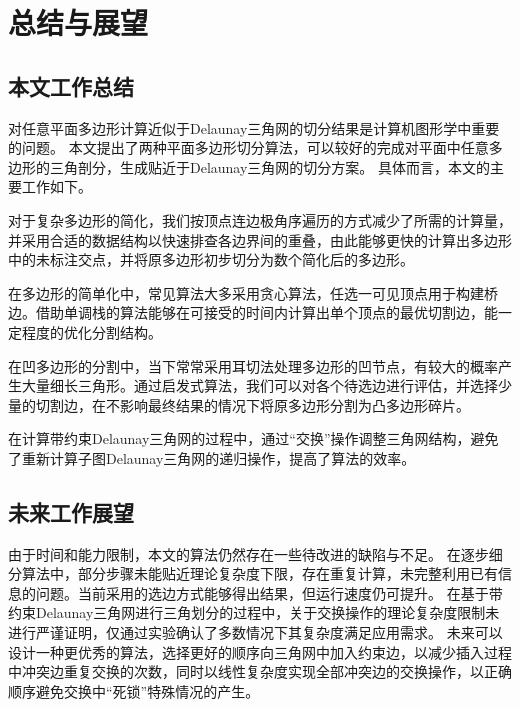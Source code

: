 \chapter{总结与展望}
\section{本文工作总结}
对任意平面多边形计算近似于Delaunay三角网的切分结果是计算机图形学中重要的问题。
本文提出了两种平面多边形切分算法，可以较好的完成对平面中任意多边形的三角剖分，生成贴近于Delaunay三角网的切分方案。
具体而言，本文的主要工作如下。

对于复杂多边形的简化，我们按顶点连边极角序遍历的方式减少了所需的计算量，并采用合适的数据结构以快速排查各边界间的重叠，由此能够更快的计算出多边形中的未标注交点，并将原多边形初步切分为数个简化后的多边形。

在多边形的简单化中，常见算法大多采用贪心算法，任选一可见顶点用于构建桥边。借助单调栈的算法能够在可接受的时间内计算出单个顶点的最优切割边，能一定程度的优化分割结构。

在凹多边形的分割中，当下常常采用耳切法处理多边形的凹节点，有较大的概率产生大量细长三角形。通过启发式算法，我们可以对各个待选边进行评估，并选择少量的切割边，在不影响最终结果的情况下将原多边形分割为凸多边形碎片。

在计算带约束Delaunay三角网的过程中，通过“交换”操作调整三角网结构，避免了重新计算子图Delaunay三角网的递归操作，提高了算法的效率。

\section{未来工作展望}
由于时间和能力限制，本文的算法仍然存在一些待改进的缺陷与不足。
在逐步细分算法中，部分步骤未能贴近理论复杂度下限，存在重复计算，未完整利用已有信息的问题。当前采用的选边方式能够得出结果，但运行速度仍可提升。
在基于带约束Delaunay三角网进行三角划分的过程中，关于交换操作的理论复杂度限制未进行严谨证明，仅通过实验确认了多数情况下其复杂度满足应用需求。
未来可以设计一种更优秀的算法，选择更好的顺序向三角网中加入约束边，以减少插入过程中冲突边重复交换的次数，同时以线性复杂度实现全部冲突边的交换操作，以正确顺序避免交换中“死锁”特殊情况的产生。

